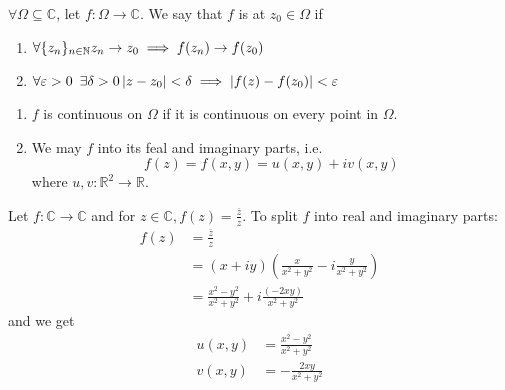 \documentclass[11pt, oneside]{book}
\begin{document}
\begin{defn}[Continuity]\label{defn:Continuity}
	$\forall \Omega \subseteq \mathbb{C}$, let $f: \Omega \to \mathbb{C}$. We say that $f$ is  at $z_0 \in \Omega$ if
	\begin{enumerate}
		\item $\forall \{z_n\}_{n \in \mathbb{N}} \\
				z_n \to z_0 \implies f(z_n) \to f(z_0)$
		\item $\forall \varepsilon > 0 \enspace \exists \delta > 0 \\
				\left|z - z_0\right| < \delta \implies \left|f(z) - f(z_0)\right| < \varepsilon$
	\end{enumerate}
\end{defn}

\begin{remark}
	\begin{enumerate}
		\item $f$ is continuous on $\Omega$ if it is continuous on every point in $\Omega$.
		\item We may  $f$ into its feal and imaginary parts, i.e.
			\begin{equation}\label{eq:complex function expressed in real-valued functions}
				f(z) = f(x, y) = u(x, y) + iv(x, y)
			\end{equation}
			where $u, v : \mathbb{R}^2 \to \mathbb{R}$.
	\end{enumerate}
\end{remark}

\begin{eg}
	Let $f: \mathbb{C} \to \mathbb{C}$ and for $z \in \mathbb{C}, f(z) = \frac{\bar{z}}{z}$. To split $f$ into real and imaginary parts:
	\begin{align*}
		f(z) &= \frac{\bar{z}}{z} \\
			&= (x + iy)\left(\frac{x}{x^2 + y^2} - i \frac{y}{x^2 + y^2} \right) \\
			&= \frac{x^2 - y^2}{x^2 + y^2} + i \frac{(-2xy)}{x^2 + y^2} 
	\end{align*}
	and we get
	\begin{align*}
		u(x, y) &= \frac{x^2 - y^2}{x^2 + y^2} \\
		v(x, y) &= -\frac{2xy}{x^2 + y^2} 
	\end{align*}
\end{eg}


\end{document}
